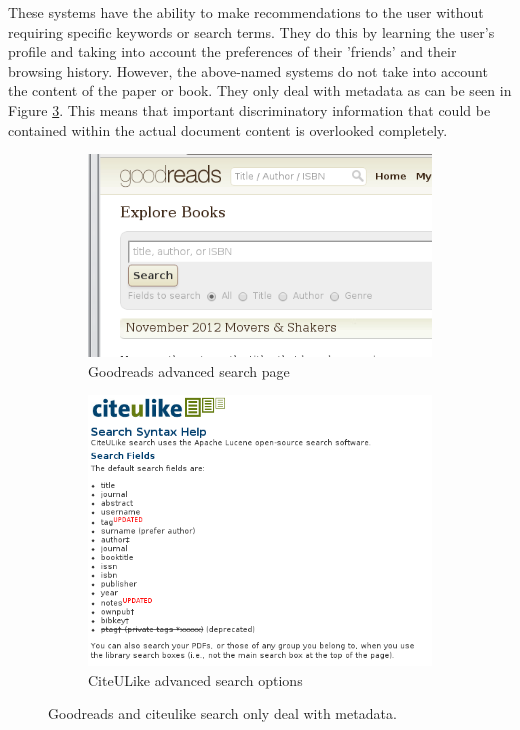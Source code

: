 These systems have the ability to make recommendations to the user without
requiring specific keywords or search terms. They do this by learning the
user's profile and taking into account the preferences of their 'friends' and
their browsing history. However, the above-named systems do not take into
account the content of the paper or book. They only deal with metadata as can
be seen in Figure \ref{fig:social_searches}. This means that important
discriminatory information that could be contained within the actual document
content is overlooked completely. 

\begin{figure}[!hbt]
        \centering
        \begin{subfigure}[b]{0.50\textwidth}
                \centering
                \includegraphics[width=\textwidth]{images/goodreads_search.png}
                \caption{Goodreads advanced search page}
                \label{fig:goodreads_search}
        \end{subfigure}%
        \begin{subfigure}[b]{0.50\textwidth}
                \centering
                \includegraphics[width=\textwidth]{images/citeulike_search.png}
                \caption{CiteULike advanced search options}
                \label{fig:citeulike_search}
        \end{subfigure}

        \caption{Goodreads and citeulike search only deal with metadata.}
        \label{fig:social_searches}
\end{figure}


